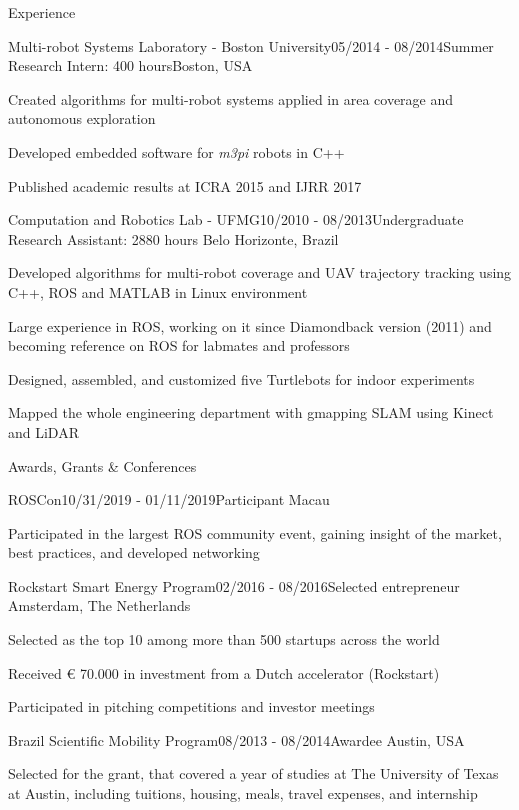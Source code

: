 \documentclass[14pt, a4paper]{resume} %
\begin{document}
\begin{rSection}{Experience}
\begin{rSubsection}{Multi-robot Systems Laboratory - Boston University}{05/2014 - 08/2014}{\normalfont Summer Research Intern: 400 hours}{\normalfont Boston,  USA}
	\item Created algorithms for multi-robot systems applied in area coverage and autonomous exploration
	\item Developed embedded software for \textit{m3pi} robots in C++
	\item Published academic results at ICRA 2015 and IJRR 2017
\newline
\newline	
\end{rSubsection}
 

\begin{rSubsection}{Computation and Robotics Lab - UFMG}{10/2010 - 08/2013}{\normalfont Undergraduate Research Assistant: 2880 hours}{ \normalfont Belo Horizonte, Brazil}
 	\item Developed algorithms for multi-robot coverage and UAV trajectory tracking using C++, ROS and MATLAB in Linux environment 
	\item Large experience in ROS, working on it since Diamondback version (2011) and becoming reference on ROS for labmates and professors
 	\item Designed, assembled, and customized five Turtlebots for indoor experiments
	\item Mapped the whole engineering department with gmapping SLAM using Kinect and LiDAR
\end{rSubsection}
\end{rSection}


\begin{rSection}{Awards, Grants \& Conferences}
\begin{rSubsection}{ROSCon}{10/31/2019 - 01/11/2019}{Participant}{ \normalfont Macau}
	\item Participated in the largest ROS community event, gaining insight of the market, best practices, and developed networking
\end{rSubsection}

\begin{rSubsection}{Rockstart Smart Energy Program}{02/2016 - 08/2016}{Selected entrepreneur}{ \normalfont Amsterdam, The Netherlands}
	\item Selected as the top 10  among more than 500 startups across the world
	\item Received € 70.000 in investment from a Dutch accelerator (Rockstart)
	\item Participated in pitching competitions and investor meetings
\end{rSubsection}

\begin{rSubsection}{Brazil Scientific Mobility Program}{08/2013 - 08/2014}{Awardee}{ \normalfont Austin, USA}
	\item Selected for the grant, that covered a year of studies at The University of Texas at Austin, including tuitions, housing, meals, travel expenses, and internship
\end{rSubsection}

\end{rSection}
\end{document}

